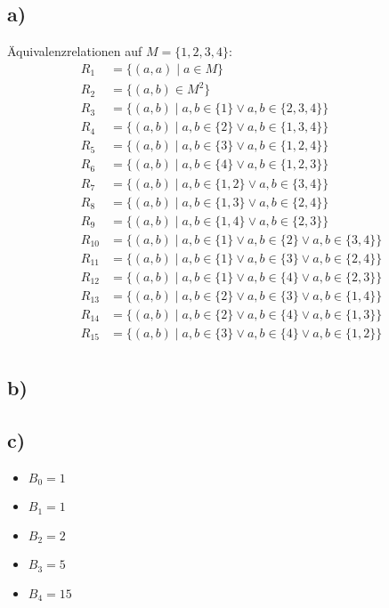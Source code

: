 \documentclass[a4paper]{scrartcl}
\begin{document}
\subsection*{a)}
Äquivalenzrelationen auf $M = \{1,2,3,4\}$:
\begin{align*}
    R_1 &= \{(a,a) \mid a \in M \} \\
    R_2 &= \{(a,b) \in M^2 \} \\
    R_3 &= \{(a,b) \mid a,b \in \{ 1 \} \lor a, b \in \{2, 3, 4\}  \} \\
    R_4 &= \{(a,b) \mid a,b \in \{ 2 \} \lor a, b \in \{1, 3, 4\}  \} \\
    R_5 &= \{(a,b) \mid a,b \in \{ 3 \} \lor a, b \in \{1, 2, 4\}  \} \\
    R_6 &= \{(a,b) \mid a,b \in \{ 4 \} \lor a, b \in \{1, 2, 3\}  \} \\
    R_7 &= \{(a,b) \mid a,b \in \{ 1,2 \} \lor a, b \in \{3 ,4\}  \} \\
    R_8 &= \{(a,b) \mid a,b \in \{ 1,3 \} \lor a, b \in \{2 ,4\}  \} \\
    R_9 &= \{(a,b) \mid a,b \in \{ 1,4 \} \lor a, b \in \{2 ,3\}  \} \\
    R_{10} &= \{(a,b) \mid a,b \in \{ 1 \} \lor a, b \in \{2\} \lor a,b \in \{ 3,4 \} \} \\
    R_{11} &= \{(a,b) \mid a,b \in \{ 1 \} \lor a, b \in \{3\} \lor a,b \in \{ 2,4 \} \} \\
    R_{12} &= \{(a,b) \mid a,b \in \{ 1 \} \lor a, b \in \{4\} \lor a,b \in \{ 2,3 \} \} \\
    R_{13} &= \{(a,b) \mid a,b \in \{ 2 \} \lor a, b \in \{3\} \lor a,b \in \{ 1,4 \} \} \\
    R_{14} &= \{(a,b) \mid a,b \in \{ 2 \} \lor a, b \in \{4\} \lor a,b \in \{ 1,3 \} \} \\
    R_{15} &= \{(a,b) \mid a,b \in \{ 3 \} \lor a, b \in \{4\} \lor a,b \in \{ 1,2 \} \} \\
\end{align*}

\subsection*{b)}

\subsection*{c)}
\begin{itemize}
    \item $B_0 = 1$
    \item $B_1 = 1$
    \item $B_2 = 2$
    \item $B_3 = 5$
    \item $B_4 = 15$
\end{itemize}
\end{document}
